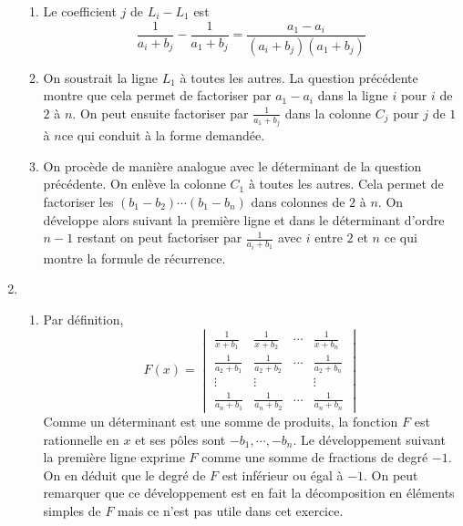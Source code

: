 \begin{enumerate}
\begin{enumerate}
  \item Le coefficient $j$ de $L_i-L_1$ est
\begin{displaymath}
\frac{1}{a_i+b_j} - \frac{1}{a_1+b_j} = \frac{a_1-a_i}{(a_i+b_j)(a_1+b_j)}  
\end{displaymath}

  \item On soustrait la ligne $L_1$ à toutes les autres. La question précédente montre que cela permet de factoriser par $a_1-a_i$ dans la ligne $i$ pour $i$ de $2$ à $n$. On peut ensuite factoriser par $\frac{1}{a_1+b_j}$ dans la colonne $C_j$ pour $j$ de $1$ à $n$ce qui conduit à la forme demandée.
  
  \item On procède de manière analogue avec le déterminant de la question précédente. On enlève la colonne $C_1$ à toutes les autres. Cela permet de factoriser les $(b_1-b_2)\cdots (b_1-b_n)$ dans colonnes de $2$ à $n$. On développe alors suivant la première ligne et dans le déterminant d'ordre $n-1$ restant on peut factoriser par $\frac{1}{a_i+b_1}$ avec $i$ entre $2$ et $n$ ce qui montre la formule de récurrence.
\end{enumerate}

  \item
\begin{enumerate}
  \item Par définition,
\begin{displaymath}
F(x)=
\begin{vmatrix}
  \frac{1}{x+b_1} & \frac{1}{x+b_2} & \cdots & \frac{1}{x+b_n} \\ 
  \frac{1}{a_2+b_1} & \frac{1}{a_2+b_2} & \cdots & \frac{1}{a_2+b_n} \\
  \vdots            & \vdots            &        & \vdots \\
  \frac{1}{a_n+b_1} & \frac{1}{a_n+b_2} & \cdots & \frac{1}{a_n+b_n}
\end{vmatrix}
\end{displaymath}
Comme un déterminant est une somme de produits, la fonction $F$ est rationnelle en $x$ et ses pôles sont $-b_1, \cdots, -b_n$. Le développement suivant la première ligne exprime $F$ comme une somme de fractions de degré $-1$. On en déduit que le degré de $F$ est inférieur ou égal à $-1$. On peut remarquer que ce développement est en fait la décomposition en éléments simples de $F$ mais ce n'est pas utile dans cet exercice.


\end{enumerate}
\end{enumerate}
